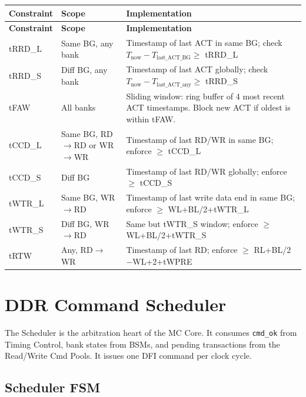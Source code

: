 \documentclass[11pt,a4paper]{article}
\begin{document}
\begin{longtable}{L{3.2cm} L{3.2cm} L{8.1cm}}
\toprule
\textbf{Constraint} & \textbf{Scope} & \textbf{Implementation} \\
\midrule
\endfirsthead\toprule\textbf{Constraint}&\textbf{Scope}&\textbf{Implementation}\\\midrule\endhead\bottomrule\endfoot
{}
tRRD\_L  & Same BG, any bank    & Timestamp of last ACT in same BG; check $T_{\text{now}} - T_{\text{last\_ACT\_BG}} \geq$ tRRD\_L \\
tRRD\_S  & Diff BG, any bank    & Timestamp of last ACT globally; check $T_{\text{now}} - T_{\text{last\_ACT\_any}} \geq$ tRRD\_S \\
tFAW     & All banks            & Sliding window: ring buffer of 4 most recent ACT timestamps. Block new ACT if oldest is within tFAW. \\
tCCD\_L  & Same BG, RD$\to$RD or WR$\to$WR & Timestamp of last RD/WR in same BG; enforce $\geq$ tCCD\_L \\
tCCD\_S  & Diff BG              & Timestamp of last RD/WR globally; enforce $\geq$ tCCD\_S \\
tWTR\_L  & Same BG, WR$\to$RD  & Timestamp of last write data end in same BG; enforce $\geq$ WL+BL/2+tWTR\_L \\
tWTR\_S  & Diff BG, WR$\to$RD  & Same but tWTR\_S window; enforce $\geq$ WL+BL/2+tWTR\_S \\
tRTW     & Any, RD$\to$WR       & Timestamp of last RD; enforce $\geq$ RL+BL/2$-$WL+2+tWPRE \\
\bottomrule
\end{longtable}

\section{DDR Command Scheduler}

\begin{notebox}
The Scheduler is the arbitration heart of the MC Core. It consumes \texttt{cmd\_ok}
from Timing Control, bank states from BSMs, and pending transactions from the Read/Write
Cmd Pools. It issues one DFI command per clock cycle.
\end{notebox}

\subsection{Scheduler FSM}
\end{document}
